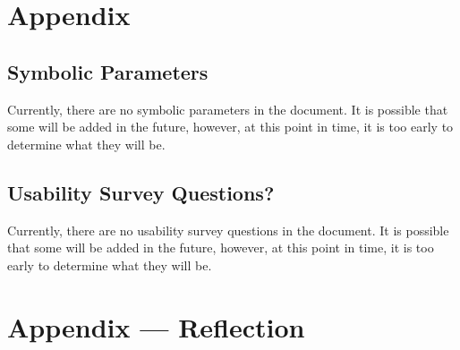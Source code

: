 \documentclass[12pt, titlepage]{article}
\begin{document}
					
					
					





				




\newpage

\section{Appendix}


\subsection{Symbolic Parameters}

Currently, there are no symbolic parameters in the document. It is possible that some will be added in the future, however, 
at this point in time, it is too early to determine what they will be.

\subsection{Usability Survey Questions?}

Currently, there are no usability survey questions in the document. It is possible that some will be added in the future, however,
at this point in time, it is too early to determine what they will be.

\newpage{}
\section*{Appendix --- Reflection}
\end{document}
